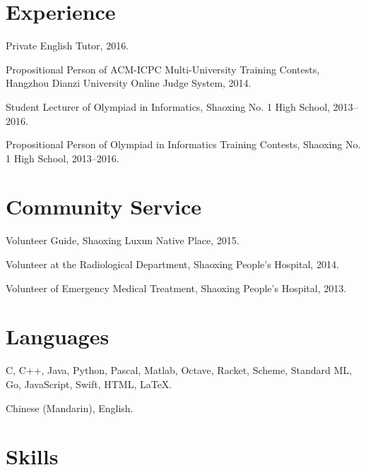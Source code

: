 \documentclass[letterpaper]{article}
\renewenvironment{itemize}{
  \begin{list}{}{
    \setlength{\leftmargin}{1.5em}
  }
}{
  \end{list}
}
\begin{document}
\section*{Experience}

\begin{itemize}
  \item Private English Tutor, 2016.

  \item Propositional Person of ACM-ICPC Multi-University Training Contests, Hangzhou Dianzi University Online Judge System, 2014.

  \item Student Lecturer of Olympiad in Informatics, Shaoxing No. 1 High School, 2013--2016.
 
  \item Propositional Person of Olympiad in Informatics Training Contests, Shaoxing No. 1 High School, 2013--2016.
\end{itemize}


\section*{Community Service}

\begin{itemize}
  \item Volunteer Guide, Shaoxing Luxun Native Place, 2015.

  \item Volunteer at the Radiological Department, Shaoxing People's Hospital, 2014.

  \item Volunteer of Emergency Medical Treatment, Shaoxing People's Hospital, 2013.
    
\end{itemize}


\section*{Languages}

\begin{itemize}
  \item C, C++, Java, Python, Pascal, Matlab, Octave, Racket, Scheme, Standard ML, Go, JavaScript, Swift, HTML, \LaTeX.
  \item Chinese (Mandarin), English.
\end{itemize}


\section*{Skills}
\end{document}
